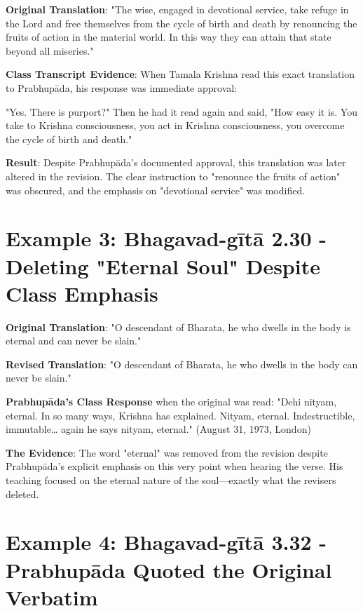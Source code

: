 \documentclass[11pt,twoside]{book}
\begin{document}
\textbf{\textbf{Original Translation}}: "The wise, engaged in devotional service, take refuge in the Lord and free themselves from the cycle of birth and death by renouncing the fruits of action in the material world. In this way they can attain that state beyond all miseries."

\textbf{\textbf{Class Transcript Evidence}}: When Tamala Krishna read this exact translation to Prabhupāda, his response was immediate approval:

"Yes. There is purport?" Then he had it read again and said, "How easy it is. You take to Krishna consciousness, you act in Krishna consciousness, you overcome the cycle of birth and death." 

\textbf{\textbf{Result}}: Despite Prabhupāda's documented approval, this translation was later altered in the revision. The clear instruction to "renounce the fruits of action" was obscured, and the emphasis on "devotional service" was modified.

\vspace{-0.3cm}
\section*{Example 3: Bhagavad-gītā 2.30 - Deleting "Eternal Soul" Despite Class Emphasis}
\label{sec:org44bde69}

\textbf{\textbf{Original Translation}}: "O descendant of Bharata, he who dwells in the body is eternal and can never be slain."

\textbf{\textbf{Revised Translation}}: "O descendant of Bharata, he who dwells in the body can never be slain."

\textbf{\textbf{Prabhupāda's Class Response}} when the original was read:
"Dehi nityam, eternal. In so many ways, Krishna has explained. Nityam, eternal. Indestructible, immutable\ldots{} again he says nityam, eternal." (August 31, 1973, London)

\textbf{\textbf{The Evidence}}: The word "eternal" was removed from the revision despite Prabhupāda's explicit emphasis on this very point when hearing the verse. His teaching focused on the eternal nature of the soul—exactly what the revisers deleted.

\vspace{-0.3cm}
\section*{Example 4: Bhagavad-gītā 3.32 - Prabhupāda Quoted the Original Verbatim}
\label{sec:orge3b7406}
\end{document}

